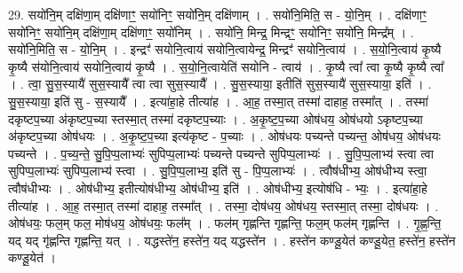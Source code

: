 \documentclass[17pt]{extarticle}
\begin{document}
29. सयो॑नि॒म् दक्षि॑णा॒म् दक्षि॑णाꣳ॒॒ सयो॑निꣳ॒॒ सयो॑नि॒म् दक्षि॑णाम् । . सयो॑नि॒मिति॒ स - यो॒नि॒म् । . दक्षि॑णाꣳ॒॒ सयो॑निꣳ॒॒ सयो॑नि॒म् दक्षि॑णा॒म् दक्षि॑णाꣳ॒॒ सयो॑निम् । . सयो॑नि॒ मिन्द्र॒ मिन्द्रꣳ॒॒ सयो॑निꣳ॒॒ सयो॑नि॒ मिन्द्र᳚म् । . सयो॑नि॒मिति॒ स - यो॒नि॒म् । . इन्द्रꣳ॑ सयोनि॒त्वाय॑ सयोनि॒त्वायेन्द्र॒ मिन्द्रꣳ॑ सयोनि॒त्वाय॑ । . स॒यो॒नि॒त्वाय॑ कृ॒ष्यै कृ॒ष्यै स॑योनि॒त्वाय॑ सयोनि॒त्वाय॑ कृ॒ष्यै । . स॒यो॒नि॒त्वायेति॑ सयोनि - त्वाय॑ । . कृ॒ष्यै त्वा᳚ त्वा कृ॒ष्यै कृ॒ष्यै त्वा᳚ । . त्वा॒ सु॒स॒स्यायै॑ सुस॒स्यायै᳚ त्वा त्वा सुस॒स्यायै᳚ । . सु॒स॒स्याया॒ इतीति॑ सुस॒स्यायै॑ सुस॒स्याया॒ इति॑ । . सु॒स॒स्याया॒ इति॑ सु - स॒स्यायै᳚ । . इत्या॑हा॒हे तीत्या॑ह । . आ॒ह॒ तस्मा॒त् तस्मा॑ दाहाह॒ तस्मा᳚त् । . तस्मा॑ दकृष्टप॒च्या अ॑कृष्टप॒च्या स्तस्मा॒त् तस्मा॑ दकृष्टप॒च्याः । . अ॒कृ॒ष्ट॒प॒च्या ओष॑धय॒ ओष॑धयो ऽकृष्टप॒च्या अ॑कृष्टप॒च्या ओष॑धयः । . अ॒कृ॒ष्ट॒प॒च्या इत्य॑कृष्ट - प॒च्याः । . ओष॑धयः पच्यन्ते पच्यन्त॒ ओष॑धय॒ ओष॑धयः पच्यन्ते । . प॒च्य॒न्ते॒ सु॒पि॒प्प॒लाभ्यः॑ सुपिप्प॒लाभ्यः॑ पच्यन्ते पच्यन्ते सुपिप्प॒लाभ्यः॑ । . सु॒पि॒प्प॒लाभ्य॑ स्त्वा त्वा सुपिप्प॒लाभ्यः॑ सुपिप्प॒लाभ्य॑ स्त्वा । . सु॒पि॒प्प॒लाभ्य॒ इति॑ सु - पि॒प्प॒लाभ्यः॑ । . त्वौष॑धीभ्य॒ ओष॑धीभ्य स्त्वा॒ त्वौष॑धीभ्यः । . ओष॑धीभ्य॒ इतीत्योष॑धीभ्य॒ ओष॑धीभ्य॒ इति॑ । . ओष॑धीभ्य॒ इत्योष॑धि - भ्यः॒ । . इत्या॑हा॒हे तीत्या॑ह । . आ॒ह॒ तस्मा॒त् तस्मा॑ दाहाह॒ तस्मा᳚त् । . तस्मा॒ दोष॑धय॒ ओष॑धय॒ स्तस्मा॒त् तस्मा॒ दोष॑धयः । . ओष॑धयः॒ फल॒म् फल॒ मोष॑धय॒ ओष॑धयः॒ फल᳚म् । . फल॑म् गृह्णन्ति गृह्णन्ति॒ फल॒म् फल॑म् गृह्णन्ति । . गृ॒ह्ण॒न्ति॒ यद् यद् गृ॑ह्णन्ति गृह्णन्ति॒ यत् । . यद्धस्ते॑न॒ हस्ते॑न॒ यद् यद्धस्ते॑न । . हस्ते॑न कण्डू॒येत॑ कण्डू॒येत॒ हस्ते॑न॒ हस्ते॑न कण्डू॒येत॑ । \newline
\end{document}

